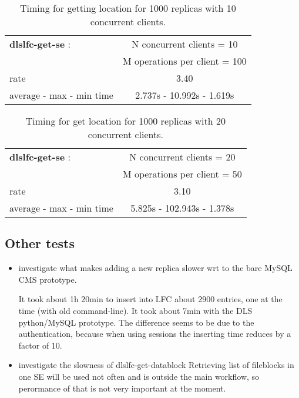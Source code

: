 \documentclass[pdftex]{cmspaper}
\begin{document}
\begin{table}[!htbp]
\begin{center}
 \begin{tabular}{|l|c|}         \hline
   {\bf dlslfc-get-se} : & N concurrent clients = 10  \\
   & M operations per client = 100\\ \hline
    rate             & 3.40 \\ \hline
    average - max - min time     &  2.737s - 10.992s - 1.619s \\ \hline
\end{tabular}
\caption {Timing for getting location for 1000 replicas with 10 concurrent clients.}\label{dlslfc-get-se}
\end{center}
\end{table}

\begin{table}[!htbp]
\begin{center}
 \begin{tabular}{|l|c|}         \hline
   {\bf dlslfc-get-se} : & N concurrent clients = 20  \\ 
 & M operations per client = 50\\ \hline
    rate             &  3.10 \\ \hline
    average - max - min time     &   5.825s - 102.943s - 1.378s \\ \hline
\end{tabular}
\caption {Timing for get location for 1000 replicas with 20 concurrent clients.}\label{dlslfc-get-se}
\end{center}
\end{table}
\subsection {Other tests}

\begin{itemize}

 \item investigate what makes adding a new replica slower wrt to the bare MySQL CMS prototype. 
      
       It took about 1h 20min to insert into LFC about 2900 entries, one at the time (with old command-line).
       It took about 7min with the DLS python/MySQL prototype.
       The difference seems to be due to the authentication, because when using sessions the 
       inserting time reduces by a factor of 10. 

 \item investigate the slowness of dlslfc-get-datablock 
       Retrieving list of fileblocks in one SE will be used not often and is outside the main workflow, so perormance of that is not very important at the moment.
       
                                                                                                  
  \end{itemize} 
\end{document}
